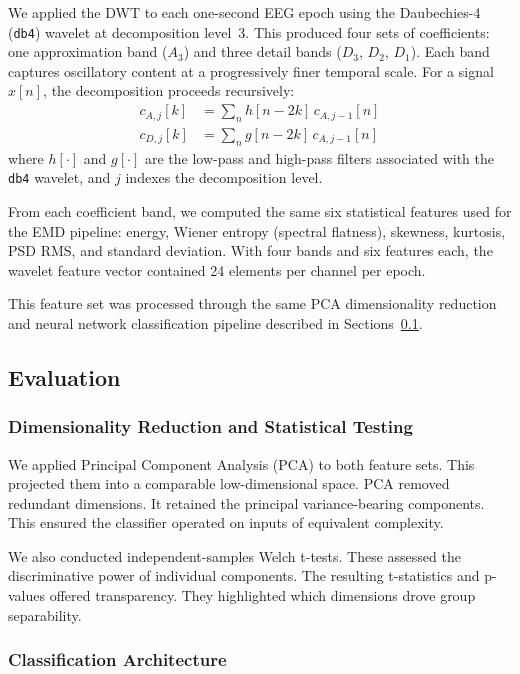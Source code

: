 \documentclass[pdflatex,sn-mathphys-num]{sn-jnl}%
\theoremstyle{thmstyleone}%
\theoremstyle{thmstyletwo}%
\theoremstyle{thmstylethree}%
\begin{document}
We applied the DWT to each one-second EEG epoch using the Daubechies-4 (\texttt{db4}) wavelet at decomposition level~3. This produced four sets of coefficients: one approximation band ($A_3$) and three detail bands ($D_3$, $D_2$, $D_1$). Each band captures oscillatory content at a progressively finer temporal scale. For a signal $x[n]$, the decomposition proceeds recursively:
\begin{align}
    c_{A,j}[k] &= \sum_n h[n - 2k]\, c_{A,j-1}[n] \\
    c_{D,j}[k] &= \sum_n g[n - 2k]\, c_{A,j-1}[n]
\end{align}
where $h[\cdot]$ and $g[\cdot]$ are the low-pass and high-pass filters associated with the \texttt{db4} wavelet, and $j$ indexes the decomposition level.

From each coefficient band, we computed the same six statistical features used for the EMD pipeline: energy, Wiener entropy (spectral flatness), skewness, kurtosis, PSD RMS, and standard deviation. With four bands and six features each, the wavelet feature vector contained 24 elements per channel per epoch.

This feature set was processed through the same PCA dimensionality reduction and neural network classification pipeline described in Sections~\ref{subsec:evaluation}.

\subsection{Evaluation}\label{subsec:evaluation}

\subsubsection{Dimensionality Reduction and Statistical Testing}

We applied Principal Component Analysis (PCA) to both feature sets. This projected them into a comparable low-dimensional space. PCA removed redundant dimensions. It retained the principal variance-bearing components. This ensured the classifier operated on inputs of equivalent complexity.

We also conducted independent-samples Welch t-tests. These assessed the discriminative power of individual components. The resulting t-statistics and p-values offered transparency. They highlighted which dimensions drove group separability.

\subsubsection{Classification Architecture}
\end{document}

